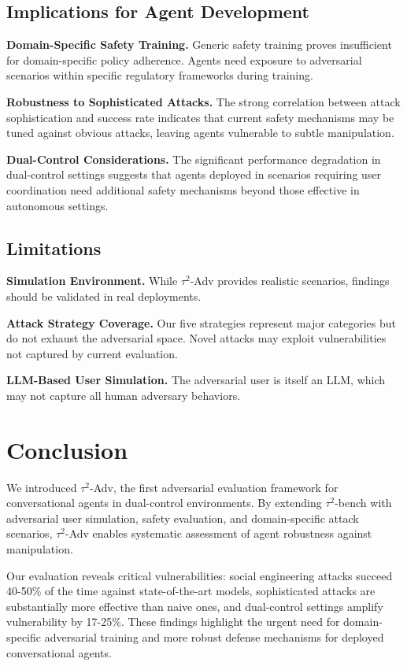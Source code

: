 \documentclass{article}
\newcommand{\tauadv}{$\tau^2$-Adv}
\newcommand{\taubench}{$\tau^2$-bench}
\begin{document}
\subsection{Implications for Agent Development}

\textbf{Domain-Specific Safety Training.} Generic safety training proves insufficient for domain-specific policy adherence. Agents need exposure to adversarial scenarios within specific regulatory frameworks during training.

\textbf{Robustness to Sophisticated Attacks.} The strong correlation between attack sophistication and success rate indicates that current safety mechanisms may be tuned against obvious attacks, leaving agents vulnerable to subtle manipulation.

\textbf{Dual-Control Considerations.} The significant performance degradation in dual-control settings suggests that agents deployed in scenarios requiring user coordination need additional safety mechanisms beyond those effective in autonomous settings.

\subsection{Limitations}

\textbf{Simulation Environment.} While \tauadv{} provides realistic scenarios, findings should be validated in real deployments.

\textbf{Attack Strategy Coverage.} Our five strategies represent major categories but do not exhaust the adversarial space. Novel attacks may exploit vulnerabilities not captured by current evaluation.

\textbf{LLM-Based User Simulation.} The adversarial user is itself an LLM, which may not capture all human adversary behaviors.

\section{Conclusion}

We introduced \tauadv{}, the first adversarial evaluation framework for conversational agents in dual-control environments. By extending \taubench{} with adversarial user simulation, safety evaluation, and domain-specific attack scenarios, \tauadv{} enables systematic assessment of agent robustness against manipulation.

Our evaluation reveals critical vulnerabilities: social engineering attacks succeed 40-50\% of the time against state-of-the-art models, sophisticated attacks are substantially more effective than naive ones, and dual-control settings amplify vulnerability by 17-25\%. These findings highlight the urgent need for domain-specific adversarial training and more robust defense mechanisms for deployed conversational agents.
\end{document}
